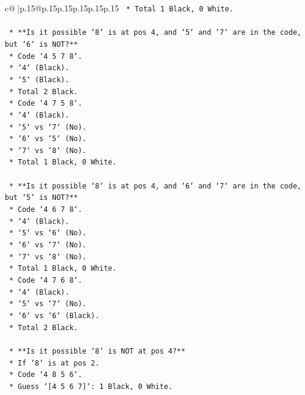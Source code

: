 \documentclass{article}
\begin{document}
{\begin{supertabular}{c@{$\;$}|p{.15\linewidth}@{}p{.15\linewidth}p{.15\linewidth}p{.15\linewidth}p{.15\linewidth}p{.15\linewidth}}
{{{\texttt{            *   Total 1 Black, 0 White.} \\
\\ 
\texttt{    *   **Is it possible `8` is at pos 4, and `5` and `7` are in the code, but `6` is NOT?**} \\
\texttt{        *   Code `4 5 7 8`.} \\
\texttt{            *   `4` (Black).} \\
\texttt{            *   `5` (Black).} \\
\texttt{            *   Total 2 Black.} \\
\texttt{        *   Code `4 7 5 8`.} \\
\texttt{            *   `4` (Black).} \\
\texttt{            *   `5` vs `7` (No).} \\
\texttt{            *   `6` vs `5` (No).} \\
\texttt{            *   `7` vs `8` (No).} \\
\texttt{            *   Total 1 Black, 0 White.} \\
\\ 
\texttt{    *   **Is it possible `8` is at pos 4, and `6` and `7` are in the code, but `5` is NOT?**} \\
\texttt{        *   Code `4 6 7 8`.} \\
\texttt{            *   `4` (Black).} \\
\texttt{            *   `5` vs `6` (No).} \\
\texttt{            *   `6` vs `7` (No).} \\
\texttt{            *   `7` vs `8` (No).} \\
\texttt{            *   Total 1 Black, 0 White.} \\
\texttt{        *   Code `4 7 6 8`.} \\
\texttt{            *   `4` (Black).} \\
\texttt{            *   `5` vs `7` (No).} \\
\texttt{            *   `6` vs `6` (Black).} \\
\texttt{            *   Total 2 Black.} \\
\\ 
\texttt{    *   **Is it possible `8` is NOT at pos 4?**} \\
\texttt{        *   If `8` is at pos 2.} \\
\texttt{        *   Code `4 8 5 6`.} \\
\texttt{            *   Guess `{[}4 5 6 7{]}`: 1 Black, 0 White.} \\
}}}
\end{supertabular}}
\end{document}
